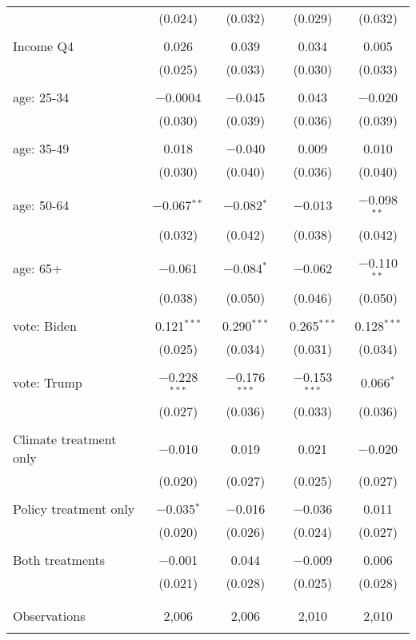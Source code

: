\begin{tabular}{@{\extracolsep{5pt}}lcccc}
  & (0.024) & (0.032) & (0.029) & (0.032) \\ 
  & & & & \\ 
 Income Q4 & 0.026 & 0.039 & 0.034 & 0.005 \\ 
  & (0.025) & (0.033) & (0.030) & (0.033) \\ 
  & & & & \\ 
 age: 25-34 & $-$0.0004 & $-$0.045 & 0.043 & $-$0.020 \\ 
  & (0.030) & (0.039) & (0.036) & (0.039) \\ 
  & & & & \\ 
 age: 35-49 & 0.018 & $-$0.040 & 0.009 & 0.010 \\ 
  & (0.030) & (0.040) & (0.036) & (0.040) \\ 
  & & & & \\ 
 age: 50-64 & $-$0.067$^{**}$ & $-$0.082$^{*}$ & $-$0.013 & $-$0.098$^{**}$ \\ 
  & (0.032) & (0.042) & (0.038) & (0.042) \\ 
  & & & & \\ 
 age: 65+ & $-$0.061 & $-$0.084$^{*}$ & $-$0.062 & $-$0.110$^{**}$ \\ 
  & (0.038) & (0.050) & (0.046) & (0.050) \\ 
  & & & & \\ 
 vote: Biden & 0.121$^{***}$ & 0.290$^{***}$ & 0.265$^{***}$ & 0.128$^{***}$ \\ 
  & (0.025) & (0.034) & (0.031) & (0.034) \\ 
  & & & & \\ 
 vote: Trump & $-$0.228$^{***}$ & $-$0.176$^{***}$ & $-$0.153$^{***}$ & 0.066$^{*}$ \\ 
  & (0.027) & (0.036) & (0.033) & (0.036) \\ 
  & & & & \\ 
 Climate treatment only & $-$0.010 & 0.019 & 0.021 & $-$0.020 \\ 
  & (0.020) & (0.027) & (0.025) & (0.027) \\ 
  & & & & \\ 
 Policy treatment only & $-$0.035$^{*}$ & $-$0.016 & $-$0.036 & 0.011 \\ 
  & (0.020) & (0.026) & (0.024) & (0.027) \\ 
  & & & & \\ 
 Both treatments & $-$0.001 & 0.044 & $-$0.009 & 0.006 \\ 
  & (0.021) & (0.028) & (0.025) & (0.028) \\ 
  & & & & \\ 
\hline \\[-1.8ex] 

Observations & 2,006 & 2,006 & 2,010 & 2,010 \\ 
\hline 
\hline \\[-1.8ex] 
\end{tabular} 